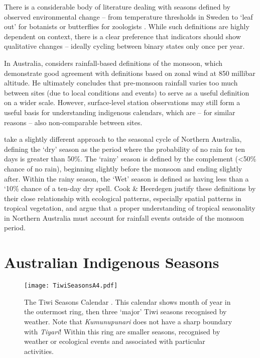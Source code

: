 
There is a considerable body of literature dealing with seasons defined
by observed environmental change -- from temperature thresholds in Sweden
 to `leaf out' for botanists \citep[eg.][]{allstadt2015}
or butterflies for zoologists \citep[eg.][]{forister2003,roy2000}.
While such definitions are highly dependent on context, there is a clear
preference that indicators should show qualitative changes -- ideally cycling
between binary states only once per year.


In Australia, \citet{holland1985} considers rainfall-based definitions of the
monsoon, which demonstrate good agreement with definitions based on zonal
wind at 850 millibar altitude.  He ultimately concludes that pre-monsoon
rainfall varies too much between sites (due to local conditions and events)
to serve as a useful definition on a wider scale.
%
However, surface-level station observations may still form a useful basis for
understanding indigenous calendars, which are -- for similar reasons -- also
non-comparable between sites.

\citet{cook2001} take a slightly different approach to the seasonal cycle of
Northern Australia, defining the `dry' season as the period where the probability
of no rain for ten days is greater than 50\%.  The `rainy' season is defined by
the complement (\textless50\% chance of no rain), beginning slightly before the
monsoon and ending slightly after.  Within the rainy season, the `Wet' season
is defined as having less than a `10\% chance of a ten-day dry spell.
%
Cook \& Heerdegen justify these definitions by their close relationship with
ecological patterns, especially spatial patterns in tropical vegetation,
and argue that a proper understanding of tropical seasonality in Northern
Australia must account for rainfall events outside of the monsoon period.



\section{Australian Indigenous Seasons}
\label{sec:aus-indig-seasons}

\begin{sidewaysfigure}
    \vspace{0.3in}
    \centerline{ \texttt{[image: TiwiSeasonsA4.pdf]} }
    \caption[The Tiwi Seasons Calendar \citep{CSIROcals}]{
        The Tiwi Seasons Calendar \citep{CSIROcals}.
        This calendar shows month of year in the outermost ring,
        then three `major' Tiwi seasons recognised by weather.
        Note that \textit{Kumunupunari} does not have a sharp boundary with \textit{Tiyari}!
        Within this ring are smaller seasons, recognised by weather
        or ecological events and associated with particular activities.
        }
    \label{fig:tiwi-seasons}
\end{sidewaysfigure}

